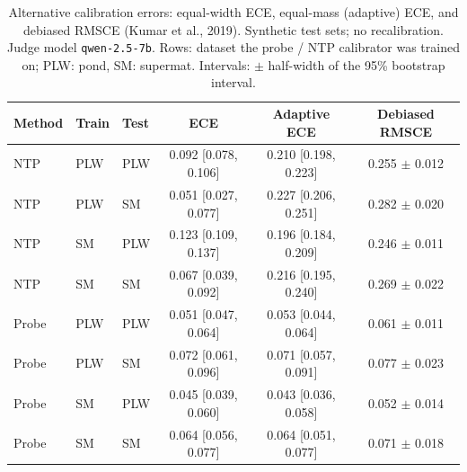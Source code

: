 \begin{table}[t]
\centering
\small
\caption{Alternative calibration errors: equal-width ECE, equal-mass (adaptive) ECE, and debiased RMSCE (Kumar et al., 2019). Synthetic test sets; no recalibration. Judge model \texttt{qwen-2.5-7b}. Rows: dataset the probe / NTP calibrator was trained on; PLW: pond, SM: supermat. Intervals: $\pm$ half-width of the 95\% bootstrap interval.}
\label{tab:calibration-validated-syn-ece-variants}
\begin{tabular}{lllccc}
\toprule
Method & Train & Test & ECE & Adaptive ECE & Debiased RMSCE \\
\midrule
NTP & PLW & PLW & 0.092 [0.078, 0.106] & 0.210 [0.198, 0.223] & 0.255 $\pm$ 0.012 \\
NTP & PLW & SM & 0.051 [0.027, 0.077] & 0.227 [0.206, 0.251] & 0.282 $\pm$ 0.020 \\
NTP & SM & PLW & 0.123 [0.109, 0.137] & 0.196 [0.184, 0.209] & 0.246 $\pm$ 0.011 \\
NTP & SM & SM & 0.067 [0.039, 0.092] & 0.216 [0.195, 0.240] & 0.269 $\pm$ 0.022 \\
\midrule
Probe & PLW & PLW & 0.051 [0.047, 0.064] & 0.053 [0.044, 0.064] & 0.061 $\pm$ 0.011 \\
Probe & PLW & SM & 0.072 [0.061, 0.096] & 0.071 [0.057, 0.091] & 0.077 $\pm$ 0.023 \\
Probe & SM & PLW & 0.045 [0.039, 0.060] & 0.043 [0.036, 0.058] & 0.052 $\pm$ 0.014 \\
Probe & SM & SM & 0.064 [0.056, 0.077] & 0.064 [0.051, 0.077] & 0.071 $\pm$ 0.018 \\
\bottomrule
\end{tabular}
\end{table}
